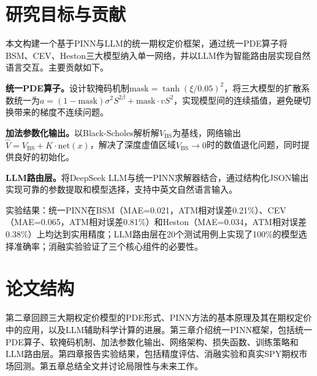 \section{研究目标与贡献}\label{sec:contributions}

本文构建一个基于PINN与LLM的统一期权定价框架，通过统一PDE算子将BSM、CEV、Heston三大模型纳入单一网络，并以LLM作为智能路由层实现自然语言交互。主要贡献如下。

\textbf{统一PDE算子。}设计软掩码机制$\text{mask}=\tanh(\xi/0.05)^2$，将三大模型的扩散系数统一为$a=(1-\text{mask})\sigma^2 S^{2\beta}+\text{mask}\cdot v S^2$，实现模型间的连续插值，避免硬切换带来的梯度不连续问题。

\textbf{加法参数化输出。}以Black-Scholes解析解$V_\text{BS}$为基线，网络输出$\hat{V}=V_\text{BS}+K\cdot\text{net}(x)$，解决了深度虚值区域$V_\text{BS}\to 0$时的数值退化问题，同时提供良好的初始化。

\textbf{LLM路由层。}将DeepSeek LLM与统一PINN求解器结合，通过结构化JSON输出实现可靠的参数提取和模型选择，支持中英文自然语言输入。

实验结果：统一PINN在BSM（MAE=0.021，ATM相对误差0.21\%）、CEV（MAE=0.065，ATM相对误差0.81\%）和Heston（MAE=0.034，ATM相对误差0.38\%）上均达到实用精度；LLM路由层在20个测试用例上实现了100\%的模型选择准确率；消融实验验证了三个核心组件的必要性。

\section{论文结构}\label{sec:structure}

第二章回顾三大期权定价模型的PDE形式、PINN方法的基本原理及其在期权定价中的应用，以及LLM辅助科学计算的进展。第三章介绍统一PINN框架，包括统一PDE算子、软掩码机制、加法参数化输出、网络架构、损失函数、训练策略和LLM路由层。第四章报告实验结果，包括精度评估、消融实验和真实SPY期权市场回测。第五章总结全文并讨论局限性与未来工作。
